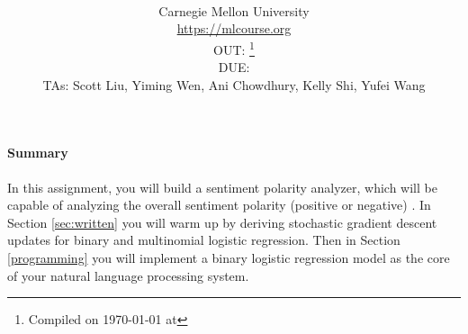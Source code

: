 \documentclass[11pt]{exam}
\title{\textsc{\hwName}} %
\author{\courseName\\
  Carnegie Mellon University \\
\url{https://mlcourse.org} \\
OUT: \outDate{} \thanks{Compiled on \today{} at \currenttime{}} \\
DUE: \dueDate{} \\ 
TAs: Scott Liu, Yiming Wen, Ani Chowdhury, Kelly Shi, Yufei Wang}
\date{}
\date{}
\numberwithin{equation}{section} %
\numberwithin{figure}{section} %
\numberwithin{table}{section} %
\begin{document}
\maketitle

\begin{notebox}
\paragraph{Summary} In this assignment, you will build a sentiment polarity analyzer, which will be capable of analyzing the overall sentiment polarity (positive or negative) . In Section  \ref{sec:written} you will warm up by deriving stochastic gradient descent updates for binary and multinomial logistic regression. Then in Section \ref{programming} you will implement a binary logistic regression model as the core of your natural language processing system.
\end{notebox}
\end{document}
